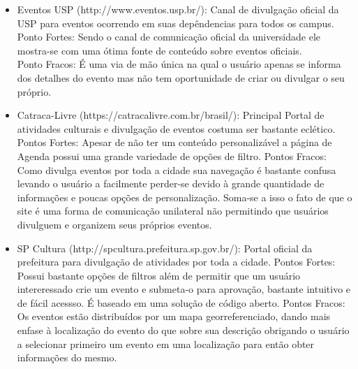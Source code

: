 \begin{itemize}
\item{Eventos USP (http://www.eventos.usp.br/):} 
Canal de divulgação oficial da USP para eventos ocorrendo em suas depêndencias para todos os campus.\\
Ponto Fortes: Sendo o canal de comunicação oficial da universidade ele mostra-se com uma ótima fonte de conteúdo sobre eventos oficiais.\\
Ponto Fracos:  É uma via de mão única na qual o usuário apenas se informa dos detalhes do evento mas não tem oportunidade de criar ou divulgar o seu próprio.
\item {Catraca-Livre (https://catracalivre.com.br/brasil/):} Principal Portal de atividades culturais e divulgação de eventos costuma ser bastante eclético. \\
Pontos Fortes: Apesar de não ter um conteúdo personalizável a página de Agenda possui uma grande variedade de opções de filtro.
Pontos Fracos: Como divulga eventos por toda a cidade sua navegação é bastante confusa levando o usuário a facilmente perder-se devido à grande quantidade de informações e poucas opções de personalização. Soma-se a isso o fato de que o site é uma forma de comunicação unilateral não permitindo que usuários divulguem e organizem seus próprios eventos.\\
\item {SP Cultura (http://spcultura.prefeitura.sp.gov.br/):} Portal oficial da prefeitura para divulgação de atividades por toda a cidade.
Pontos Fortes: Possui bastante opções de filtros além de permitir que um usuário intereressado crie um evento e submeta-o para aprovação, bastante intuitivo e de fácil acessso. É baseado em uma solução de código aberto.
Pontos Fracos: Os eventos estão distribuídos por um mapa georreferenciado, dando mais enfase à localização do evento do que sobre sua descrição obrigando o usuário a selecionar primeiro um evento em uma localização para então obter informações do mesmo.
\end{itemize}
